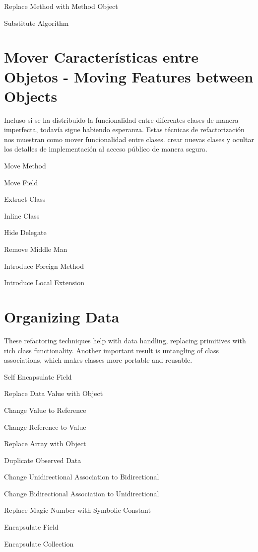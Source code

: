 \documentclass[11pt,a4paper,oneside]{book}
\begin{document}
    Replace Method with Method Object
    
    Substitute Algorithm


\section{Mover Características entre Objetos - Moving Features between Objects}
Incluso si se ha distribuido la funcionalidad entre diferentes clases de manera imperfecta, todavía sigue habiendo esperanza.
Estas técnicas de refactorización nos muestran como mover funcionalidad entre clases. crear nuevas clases y ocultar los detalles de implementación al acceso público de manera segura.


    Move Method
    
    Move Field
    
    Extract Class
    
    Inline Class
    
    Hide Delegate
    
    Remove Middle Man
    
    Introduce Foreign Method
    
    Introduce Local Extension



\section{Organizing Data}

These refactoring techniques help with data handling, replacing primitives with rich class functionality. Another important result is untangling of class associations, which makes classes more portable and reusable.

    Self Encapsulate Field
    
    Replace Data Value with Object
    
    Change Value to Reference
    
    Change Reference to Value
    
    Replace Array with Object
    
    Duplicate Observed Data
    
    Change Unidirectional Association to Bidirectional
    
    Change Bidirectional Association to Unidirectional
    
    Replace Magic Number with Symbolic Constant
    
    Encapsulate Field
    
    Encapsulate Collection
    
\end{document}
